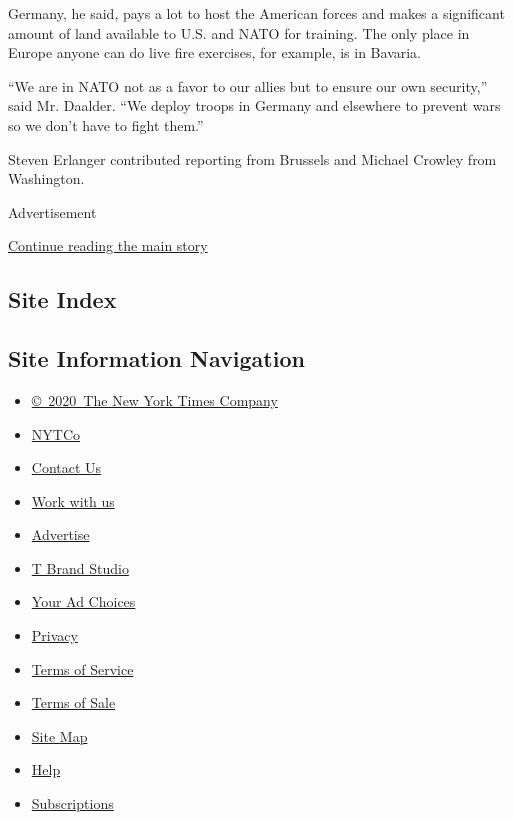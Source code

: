 Germany, he said, pays a lot to host the American forces and makes a
significant amount of land available to U.S. and NATO for training. The
only place in Europe anyone can do live fire exercises, for example, is
in Bavaria.

``We are in NATO not as a favor to our allies but to ensure our own
security,'' said Mr. Daalder. ``We deploy troops in Germany and
elsewhere to prevent wars so we don't have to fight them.''

Steven Erlanger contributed reporting from Brussels and Michael Crowley
from Washington.

Advertisement

\protect\hyperlink{after-bottom}{Continue reading the main story}

\hypertarget{site-index}{%
\subsection{Site Index}\label{site-index}}

\hypertarget{site-information-navigation}{%
\subsection{Site Information
Navigation}\label{site-information-navigation}}

\begin{itemize}
\tightlist
\item
  \href{https://help.nytimes.com/hc/en-us/articles/115014792127-Copyright-notice}{©~2020~The
  New York Times Company}
\end{itemize}

\begin{itemize}
\tightlist
\item
  \href{https://www.nytco.com/}{NYTCo}
\item
  \href{https://help.nytimes.com/hc/en-us/articles/115015385887-Contact-Us}{Contact
  Us}
\item
  \href{https://www.nytco.com/careers/}{Work with us}
\item
  \href{https://nytmediakit.com/}{Advertise}
\item
  \href{http://www.tbrandstudio.com/}{T Brand Studio}
\item
  \href{https://www.nytimes.com/privacy/cookie-policy\#how-do-i-manage-trackers}{Your
  Ad Choices}
\item
  \href{https://www.nytimes.com/privacy}{Privacy}
\item
  \href{https://help.nytimes.com/hc/en-us/articles/115014893428-Terms-of-service}{Terms
  of Service}
\item
  \href{https://help.nytimes.com/hc/en-us/articles/115014893968-Terms-of-sale}{Terms
  of Sale}
\item
  \href{https://spiderbites.nytimes.com}{Site Map}
\item
  \href{https://help.nytimes.com/hc/en-us}{Help}
\item
  \href{https://www.nytimes.com/subscription?campaignId=37WXW}{Subscriptions}
\end{itemize}
